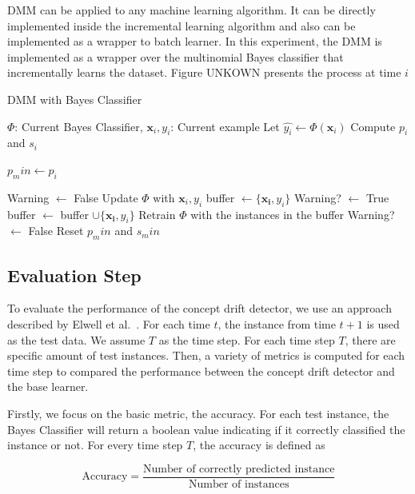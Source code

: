 DMM can be applied to any machine learning algorithm. It can be directly implemented inside the incremental learning algorithm and also can be implemented as a wrapper to batch learner. In this experiment, the DMM is implemented as a wrapper over the multinomial Bayes classifier that incrementally learns the dataset. Figure UNKOWN presents the process at time $i$


\begin{algorithm}
\caption{DMM with Bayes Classifier}
\label{ddm}
\begin{algorithmic}
\Require $\Phi$: Current Bayes Classifier, $\mathbf{x}_i, y_i$: Current example
\State Let $\hat{y_i} \leftarrow \Phi(\mathbf{x}_i)$
\State Compute $p_i$ and $s_i$

	\State $p_min \leftarrow p_i$ 
\EndIf

	\State Warning $\leftarrow$ False
	\State Update $\Phi$ with $\mathbf{x}_i, y_i$
\Else
			\State buffer $\leftarrow \{\mathbf{x_i}, y_i\}$
			\State Warning? $\leftarrow$ True
		\Else
			\State buffer $\leftarrow$ buffer $\cup \{\mathbf{x_i}, y_i\}$
		\EndIf
	\Else
		\State Retrain $\Phi$ with the instances in the buffer
		\State Warning? $\leftarrow$ False
		Reset $p_min$ and $s_min$
	\EndIf 
\EndIf 
\end{algorithmic}
\end{algorithm}

\subsection{Evaluation Step}
To evaluate the performance of the concept drift detector, we use an approach described by Elwell et al.~\cite{Elwell2011}. For each time $t$, the instance from time $t+1$ is used as the test data. We assume $T$ as the time step. For each time step $T$, there are specific amount of test instances. Then, a variety of metrics is computed for each time step to compared the performance between the concept drift detector and the base learner. 

Firstly, we focus on the basic metric, the accuracy. For each test instance, the Bayes Classifier will return a boolean value indicating if it correctly classified the instance or not. For every time step $T$, the accuracy is defined as

\begin{equation}
\mbox{Accuracy} = \frac{\mbox{Number of correctly predicted instance} }{\mbox{Number of instances}}
\end{equation}

